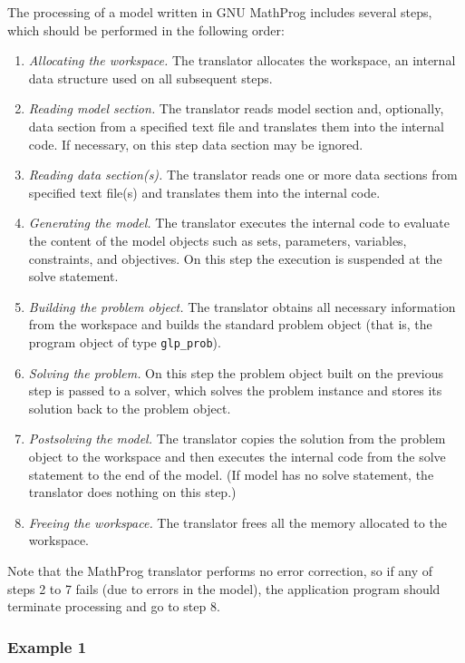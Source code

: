 The processing of a model written in GNU MathProg includes several
steps, which should be performed in the following order:

\begin{enumerate}
\item{\it Allocating the workspace.}
The translator allocates the workspace, an internal data structure used
on all subsequent steps.
\item{\it Reading model section.} The translator reads model section
and, optionally, data section from a specified text file and translates
them into the internal code. If necessary, on this step data section
may be ignored.
\item{\it Reading data section(s).} The translator reads one or more
data sections from specified text file(s) and translates them into the
internal code.
\item{\it Generating the model.} The translator executes the internal
code to evaluate the content of the model objects such as sets,
parameters, variables, constraints, and objectives. On this step the
execution is suspended at the solve statement.
\item {\it Building the problem object.} The translator obtains all
necessary information from the workspace and builds the standard
problem object (that is, the program object of type \verb|glp_prob|).
\item{\it Solving the problem.} On this step the problem object built
on the previous step is passed to a solver, which solves the problem
instance and stores its solution back to the problem object.
\item{\it Postsolving the model.} The translator copies the solution
from the problem object to the workspace and then executes the internal
code from the solve statement to the end of the model. (If model has
no solve statement, the translator does nothing on this step.)
\item{\it Freeing the workspace.} The translator frees all the memory
allocated to the workspace.
\end{enumerate}

Note that the MathProg translator performs no error correction, so if
any of steps 2 to 7 fails (due to errors in the model), the application
program should terminate processing and go to step 8.

\subsubsection*{Example 1}

